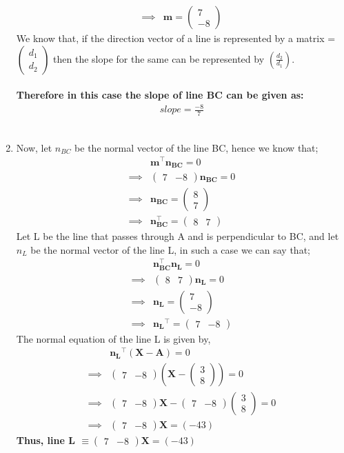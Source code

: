 \documentclass[journal,12pt,twocolumn]{IEEEtran}
\let\vec\mathbf
\providecommand{\brak}[1]{\ensuremath{\left(#1\right)}}
\newcommand{\myvec}[1]{\ensuremath{\begin{pmatrix}#1\end{pmatrix}}}
\begin{document}
\begin{enumerate}
\begin{align}
	\\
	\implies &\vec{m} = \myvec{7 \\ -8}
    \end{align}
    We know that, if the direction vector of a line is represented by a matrix \vec{m}=\myvec{d_1\\d_2} then the slope for the same can be represented by $\brak{\frac{d_2}{d_1}}$.\\
    \medskip\\
    \textbf{Therefore in this case the slope of line BC can be given as:}
    \begin{align}
        slope=\frac{-8}{7}
    \end{align}
    \medskip\\
\item Now, let $n_{BC}$ be the normal vector of the line BC, hence we know that;
    \begin{align}
	&\vec{m}^{\top}\vec{n_{BC}} = 0
	\\
	\implies &\myvec{7 & -8}\vec{n_{BC}} = 0
	\\
	\implies &\vec{n_{BC}} = \myvec{8 \\ 7}
	\\
	\implies &\vec{n_{BC}^{\top}} = \myvec{8 & 7}
    \end{align}
     Let L be the line that passes through A and is perpendicular to BC, and let $n_L$ be the normal vector of the line L, in such a case we can say that;
     \begin{align}
	&\vec{n_{BC}^{\top}} \vec{n_L} = 0
	\\
	\implies &\myvec{8 & 7}\vec{n_L} = 0
	\\
	\implies &\vec{n_L} = \myvec{7 \\ -8}
	\\
	\implies &\vec{n_L}^{\top} = \myvec{7 & -8}
    \end{align}
    The normal equation of the line L is given by, 
    \begin{align}
	&\vec{n_L}^{\top} \brak{\vec{X}-\vec{A}} = 0
	\\
	\implies &\myvec{7 & -8}\brak{\vec{X} - \myvec{3 \\ 8}}= 0
	\\
	\implies &\myvec{7 & -8}\vec{X}- \myvec{7 & -8}\myvec{3\\8}= 0
	\\
	\implies &\myvec{7 & -8}\vec{X} = \brak{-43}
    \end{align}
    \textbf{Thus, line L $\equiv \myvec{7 & -8}\vec{X} = \brak{-43}$}
\end{enumerate}
\end{document}
